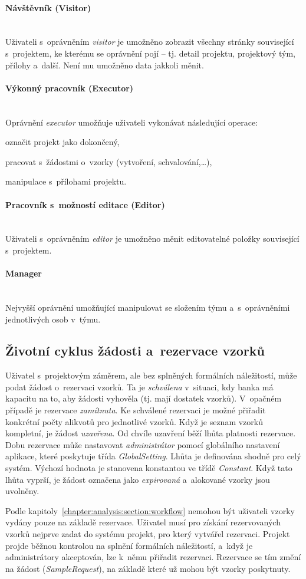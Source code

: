 \documentclass[11pt, draft, oneside]{fithesis2}
\newcommand{\paragraphNewLine}[1]{\paragraph*{#1}\mbox{}\\}
\begin{document}
\paragraphNewLine{Návštěvník (Visitor)} 
Uživateli s~oprávněním \textit{visitor} je umožněno zobrazit všechny stránky související s~projektem, ke kterému se oprávnění pojí -- tj. detail projektu, projektový tým, přílohy a~další. Není mu umožněno data jakkoli měnit.

\paragraphNewLine{Výkonný pracovník (Executor)} 
Oprávnění \textit{executor} umožňuje uživateli vykonávat následující operace:
\begin{compactitem}
	\item označit projekt jako dokončený,
	\item pracovat s~žádostmi o~vzorky (vytvoření, schvalování,\ldots),
	\item manipulace s~přílohami projektu.
\end{compactitem}

\paragraphNewLine{Pracovník s~možností editace (Editor)}
Uživateli s~oprávněním \textit{editor} je umožněno měnit editovatelné položky související s~projektem.

\paragraphNewLine{Manager}
Nejvyšší oprávnění umožňující manipulovat se složením týmu a~s~oprávněními jednotlivých osob v~týmu.

\subsection{Životní cyklus žádosti a~rezervace vzorků}
Uživatel s~projektovým záměrem, ale bez splněných formálních náležitostí, může podat žádost o~rezervaci vzorků. Ta je \textit{schválena} v~situaci, kdy banka má kapacitu na to, aby žádosti vyhověla (tj. mají dostatek vzorků). V~opačném případě je rezervace \textit{zamítnuta}. Ke schválené rezervaci je možné přiřadit konkrétní počty alikvotů pro jednotlivé vzorků. Když je seznam vzorků kompletní, je žádost \textit{uzavřena}. Od chvíle uzavření běží lhůta platnosti rezervace. Dobu rezervace může nastavovat \textit{administrátor} pomocí globálního nastavení aplikace, které poskytuje třída \textit{GlobalSetting}. Lhůta je definována shodně pro celý systém. Výchozí hodnota je stanovena konstantou ve třídě \textit{Constant}. Když tato lhůta vyprší, je žádost označena jako \textit{expirovaná} a~alokované vzorky jsou uvolněny.

Podle kapitoly~\ref{chapter:analysis:section:workflow} nemohou být uživateli vzorky vydány pouze na základě rezervace. Uživatel musí pro získání rezervovaných vzorků nejprve zadat do systému projekt, pro který vytvářel rezervaci. Projekt projde běžnou kontrolou na splnění formálních náležitostí, a~když je administrátory akceptován, lze k~němu přiřadit rezervaci. Rezervace se tím změní na žádost (\textit{SampleRequest}), na základě které už mohou být vzorky poskytnuty.
\end{document}
